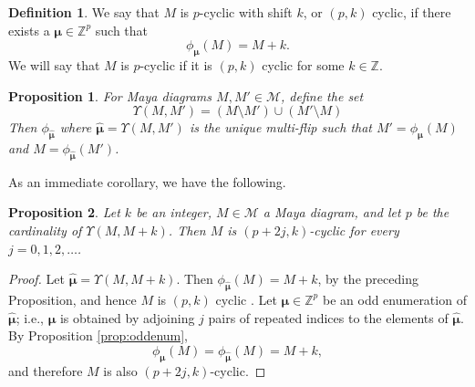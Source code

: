 \documentclass{amsart}
\newtheorem{proposition}{Proposition}
\theoremstyle{definition}
\newtheorem{definition}{Definition}
\newcommand{\Z}{\mathbb{Z}}
\newcommand{\bmu}{{\boldsymbol{\mu}}}
\newcommand{\cM}{\mathcal{M}}
\newcommand{\hbmu}{{\hat{\bmu}}}
\begin{document}
\begin{definition}
  We say that $M$ is $p$-cyclic with shift $k$, or $(p,k)$ cyclic, if
  there exists a $\bmu \in \Z^p$ such that
  \begin{equation}
    \label{eq:cyclicMdef}
    \phi_\bmu(M) = M+k.
  \end{equation}
  We will say that $M$ is $p$-cyclic if it is $(p,k)$ cyclic for some
  $k\in \Z$.
\end{definition}

\begin{proposition}
  \label{prop:muM1M2}
  For Maya diagrams $M,M'\in \cM$, define the set
  \begin{equation}
    \label{eq:muM1M2}
    \Upsilon(M,M') = (M \setminus M') \cup (M'\setminus M)
  \end{equation}
  Then $\phi_\hbmu$ where $\hbmu=\Upsilon(M,M')$ is the unique
  multi-flip such that $ M' = \phi_{\hbmu}(M)$ and
  $M = \phi_{\hbmu}(M')$.
\end{proposition}
As an immediate corollary, we have the following.
\begin{proposition}
  Let $k$ be an integer, $M\in \cM$ a Maya diagram, and let $p$ be the
  cardinality of $\Upsilon(M,M+k)$. Then $M$ is $(p+2j,k)$-cyclic for
  every $j=0,1,2,\ldots$.
\end{proposition}
\begin{proof}
  Let $\hbmu = \Upsilon(M,M+k)$.  Then $\phi_{\hbmu}(M) = M+k$, by the
  preceding Proposition, and hence $M$ is $(p,k)$ cyclic .  Let
  $\bmu\in \Z^p$ be an odd enumeration of $\hbmu$; i.e., $\bmu$ is
  obtained by adjoining $j$ pairs of repeated indices to the elements
  of $\hbmu$. By Proposition \ref{prop:oddenum},
  \[\phi_\bmu(M) = \phi_\hbmu(M) = M+k,\] and therefore $M$ is also
  $(p+2j,k)$-cyclic.
\end{proof}
\end{document}
